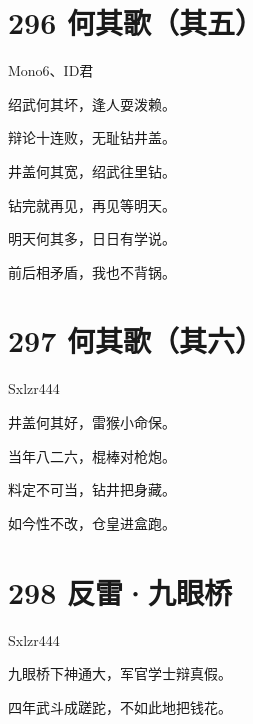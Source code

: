\documentclass[UTF8,12pt,oneside]{ctexbook}
\def\pau#1{\begin{center} {#1} \end{center}} %
\def\poem#1#2{\section{#1}\pau{#2}} %
\begin{document}
        \poem{296 何其歌（其五）}{Mono6、ID君}
        \begin{center}
            绍武何其坏，逢人耍泼赖。
            
            辩论十连败，无耻钻井盖。
            
            井盖何其宽，绍武往里钻。
            
            钻完就再见，再见等明天。
            
            明天何其多，日日有学说。
            
            前后相矛盾，我也不背锅。
        \end{center}

        \poem{297 何其歌（其六）}{Sxlzr444}
        \begin{center}
            井盖何其好，雷猴小命保。
            
            当年八二六，棍棒对枪炮。
            
            料定不可当，钻井把身藏。
            
            如今性不改，仓皇进盒跑。
        \end{center}

        \poem{298 反雷·九眼桥}{Sxlzr444}
        \begin{center}
            九眼桥下神通大，军官学士辩真假。
            
            四年武斗成蹉跎，不如此地把钱花。
        \end{center}
\end{document}

